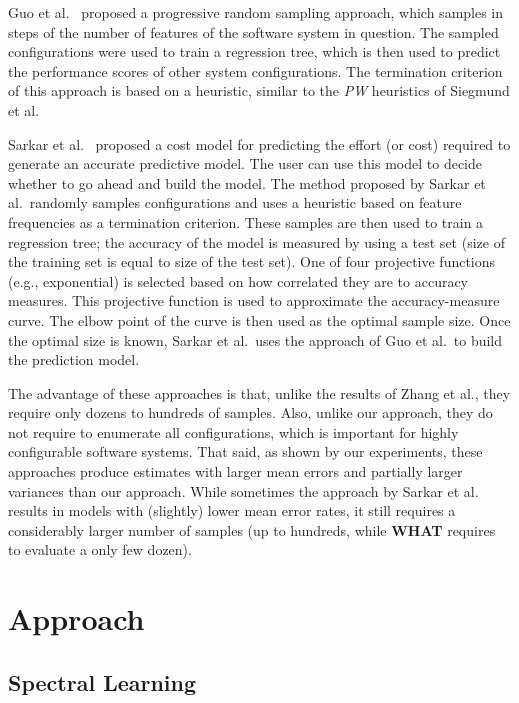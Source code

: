 \documentclass{sig-alternative}
\newcommand{\what}{{\bf WHAT }}
\begin{document}
Guo et al.~\cite{guo2013variability} proposed a progressive random sampling approach, which samples in steps of the number of features of the software system in question. The sampled configurations were used to train a regression tree, which is then used to predict the performance scores of other system configurations. The termination criterion of this approach is based on a heuristic, similar to the {\em PW} heuristics of Siegmund et al. 

Sarkar et al.~\cite{sarkar2015cost} proposed a cost model for predicting the effort (or cost) required to generate an accurate predictive model. The user can use this model to decide whether to go ahead and build the model. The method proposed by Sarkar et al.\ randomly samples configurations and uses a heuristic based on feature frequencies as a termination criterion. These samples are then used to train a regression tree; the accuracy of the model is measured by using a test set (size of the training set is equal to size of the test set). One of four projective functions (e.g., exponential) is selected based on how correlated they are to  accuracy measures. This projective function is used to approximate the accuracy-measure curve. The elbow point of the curve is then used as the optimal sample size. Once the optimal size is known, Sarkar et al.\ uses the approach of Guo et al.\ to build the prediction model.  


The advantage of these approaches is that, unlike  the results of Zhang et al., they require only dozens to hundreds of samples. Also, unlike our approach, they do not require to enumerate all configurations, which is important for highly configurable software systems. 
That said, as shown by our experiments, these approaches produce estimates with  larger mean errors and partially larger variances than our approach. While sometimes the approach by Sarkar et al. results in  models with (slightly)
lower mean error rates, it still requires a considerably larger number of samples (up to hundreds, while \what requires to evaluate a only few dozen).
 
 \section{Approach}

\subsection{Spectral Learning}\label{sect:spect}
\end{document}
